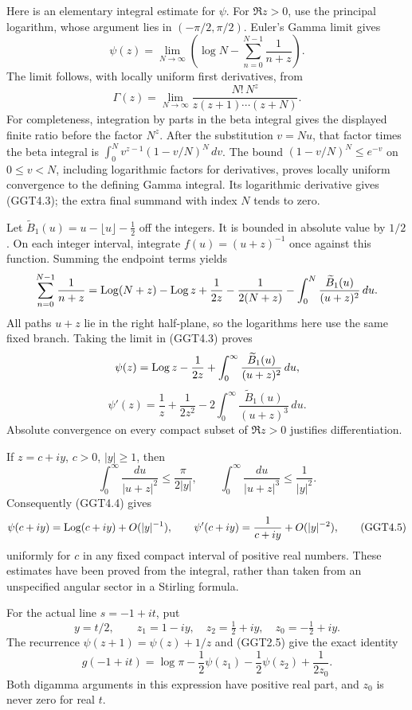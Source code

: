 Here is an elementary integral estimate for \(\psi\). For \(\Re z>0\),
use the principal logarithm, whose argument lies in \((-\pi/2,\pi/2)\).
Euler's Gamma limit gives \[
\psi(z)=\lim_{N\to\infty}
\left(\log N-\sum_{n=0}^{N-1}\frac1{n+z}\right).
\tag{GGT4.3}
\] The limit follows, with locally uniform first derivatives, from \[
\Gamma(z)=\lim_{N\to\infty}
\frac{N!\,N^z}{z(z+1)\cdots(z+N)}.
\] For completeness, integration by parts in the beta integral gives the
displayed finite ratio before the factor \(N^z\). After the substitution
\(v=Nu\), that factor times the beta integral is
\(\int_0^N v^{z-1}(1-v/N)^N\,dv\). The bound \((1-v/N)^N\le e^{-v}\) on
\(0\le v<N\), including logarithmic factors for derivatives, proves
locally uniform convergence to the defining Gamma integral. Its
logarithmic derivative gives (GGT4.3); the extra final summand with
index \(N\) tends to zero.

Let \(\widetilde B_1(u)=u-\lfloor u\rfloor-\tfrac12\) off the integers.
It is bounded in absolute value by \(1/2\). On each integer interval,
integrate \(f(u)=(u+z)^{-1}\) once against this function. Summing the
endpoint terms yields \[
\sum_{n=0}^{N-1}\frac1{n+z}
=\operatorname{Log}(N+z)-\operatorname{Log} z+\frac1{2z}-\frac1{2(N+z)}
-\int_0^N\frac{\widetilde B_1(u)}{(u+z)^2}\,du.
\] All paths \(u+z\) lie in the right half-plane, so the logarithms here
use the same fixed branch. Taking the limit in (GGT4.3) proves \[
\psi(z)=\operatorname{Log} z-\frac1{2z}
+\int_0^\infty\frac{\widetilde B_1(u)}{(u+z)^2}\,du,
\] \[
\psi'(z)=\frac1z+\frac1{2z^2}
-2\int_0^\infty\frac{\widetilde B_1(u)}{(u+z)^3}\,du.
\tag{GGT4.4}
\] Absolute convergence on every compact subset of \(\Re z>0\) justifies
differentiation.

If \(z=c+iy\), \(c>0\), \(|y|\ge1\), then \[
\int_0^\infty\frac{du}{|u+z|^2}
\le\frac{\pi}{2|y|},\qquad
\int_0^\infty\frac{du}{|u+z|^3}
\le\frac1{|y|^2}.
\] Consequently (GGT4.4) gives \[
\psi(c+iy)=\operatorname{Log}(c+iy)+O(|y|^{-1}),\qquad
\psi'(c+iy)=\frac1{c+iy}+O(|y|^{-2}),
\tag{GGT4.5}
\] uniformly for \(c\) in any fixed compact interval of positive real
numbers. These estimates have been proved from the integral, rather than
taken from an unspecified angular sector in a Stirling formula.

For the actual line \(s=-1+it\), put \[
y=t/2,\qquad z_1=1-iy,\quad z_2=\tfrac12+iy,\quad z_0=-\tfrac12+iy.
\] The recurrence \(\psi(z+1)=\psi(z)+1/z\) and (GGT2.5) give the exact
identity \[
g(-1+it)=\log\pi-\frac12\psi(z_1)
-\frac12\psi(z_2)+\frac1{2z_0}.
\tag{GGT4.6}
\] Both digamma arguments in this expression have positive real part,
and \(z_0\) is never zero for real \(t\).


